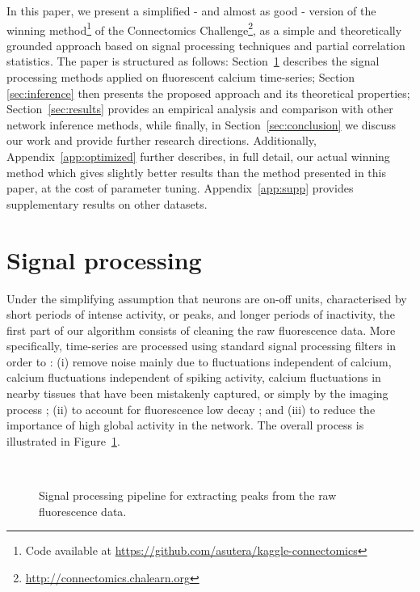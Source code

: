 \documentclass[wcp]{jmlr}
\begin{document}
In this paper, we present a simplified - and almost as good - version of the
winning method\footnote{Code available at \url{https://github.com/asutera/kaggle-connectomics}} of the Connectomics
Challenge\footnote{\url{http://connectomics.chalearn.org}}, as a simple and
theoretically grounded approach based on signal processing techniques and
partial correlation statistics. The paper is structured as follows:
Section~\ref{sec:filter} describes the signal processing methods applied on
fluorescent calcium time-series; Section \ref{sec:inference} then presents the
proposed approach and its theoretical properties; Section~\ref{sec:results}
provides an empirical analysis and comparison with other network inference
methods, while finally, in Section~\ref{sec:conclusion} we discuss our work and
provide further research directions. Additionally,
Appendix~\ref{app:optimized} further describes, in full detail, our actual
winning method which gives slightly better results than the method presented in
this paper, at the cost of parameter tuning. Appendix~\ref{app:supp} provides supplementary results on other datasets.

\section{Signal processing} \label{sec:filter}

Under the simplifying assumption that neurons are on-off units, characterised
by short periods of intense activity, or peaks, and longer periods of
inactivity, the first part of our algorithm consists of cleaning the raw
fluorescence data.
More specifically, time-series are processed using standard
signal processing filters in order to : (i) remove noise mainly due to fluctuations independent of calcium, calcium fluctuations independent of spiking activity, calcium fluctuations in nearby tissues that have been mistakenly captured, or simply by the imaging process ; (ii) to account for fluorescence low decay ; and (iii) to reduce the importance of
high global activity in the network. The overall process is illustrated in
Figure~\ref{fig:filtered-signal}.

\begin{figure}
\centering
{}
\\
\caption{Signal processing pipeline for extracting peaks from the raw fluorescence data.}
\label{fig:filtered-signal}
\end{figure}
\end{document}
